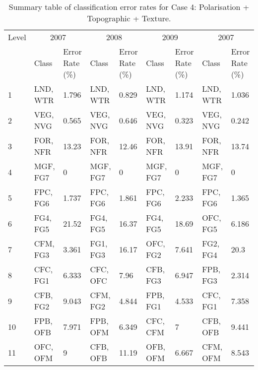 \begin{appendices}
\begin{spacing}{1.0}
\begin{longtable}[h!]{ p{1cm} p{1.5cm} p{1cm} p{1.5cm} p{1cm} p{1.5cm} p{1cm} p{1.5cm} p{1cm} }
    \bottomrule
\end{longtable}
\end{spacing}


\begin{spacing}{1.0}
\begin{longtable}[h!]{ p{1cm} p{1.5cm} p{1cm} p{1.5cm} p{1cm} p{1.5cm} p{1cm} p{1.5cm} p{1cm} }

    \caption[Summary table of classification error rates for Case 4: Polarisation + Topographic + Texture.]{Summary table of classification error rates for Case 4: Polarisation + Topographic + Texture.}
    \label{tab: appendix-table.c4}\\
    
    \toprule
    Level & \multicolumn{2}{c}{2007} & \multicolumn{2}{c}{2008} & \multicolumn{2}{c}{2009} & \multicolumn{2}{c}{2007}\\
    \cmidrule{2-9}
    {} & Class & Error Rate (\%) & Class & Error Rate (\%) & Class & Error Rate (\%) & Class & Error Rate (\%)\\
    \midrule
    \endhead

    1 & LND, WTR & 1.796 & LND, WTR & 0.829 & LND, WTR & 1.174 & LND, WTR & 1.036\\
    \cmidrule{2-9}
    2 & VEG, NVG & 0.565 & VEG, NVG & 0.646 & VEG, NVG & 0.323 & VEG, NVG & 0.242\\
    \cmidrule{2-9}
    3 & FOR, NFR & 13.23 & FOR, NFR & 12.46 & FOR, NFR & 13.91 & FOR, NFR & 13.74\\
    \cmidrule{2-9}  
    4 & MGF, FG7 & 0 & MGF, FG7 & 0 & MGF, FG7 & 0 & MGF, FG7 & 0\\
    \cmidrule{2-9}    
    5 & FPC, FG6 & 1.737 & FPC, FG6 & 1.861 & FPC, FG6 & 2.233 & FPC, FG6 & 1.365\\
    \cmidrule{2-9}
    6 & FG4, FG5 & 21.52 & FG4, FG5 & 16.37 & FG4, FG5 & 18.69 & OFC, FG5 & 6.186\\
    \cmidrule{2-9}
    7 & CFM, FG3 & 3.361 & FG1, FG3 & 16.17 & OFC, FG2 & 7.641 & FG2, FG4 & 20.3\\
    \cmidrule{2-9}
    8 & CFC, FG1 & 6.333 & CFC, OFC & 7.96 & CFB, FG3 & 6.947 & FPB, FG3 & 2.314\\
    \cmidrule{2-9}
    9 & CFB, FG2 & 9.043 & CFM, FG2 & 4.844 & FPB, FG1 & 4.533 & CFC, FG1 & 7.358\\
    \cmidrule{2-9}
    10 & FPB, OFB & 7.971 & FPB, OFM & 6.349 & CFC, CFM & 7 & CFB, OFB & 9.441\\
    \cmidrule{2-9}
    11 & OFC, OFM & 9 & CFB, OFB & 11.19 & OFB, OFM & 6.667 & CFM, OFM & 8.543\\
	

\end{longtable}
\end{spacing}
\end{appendices}
